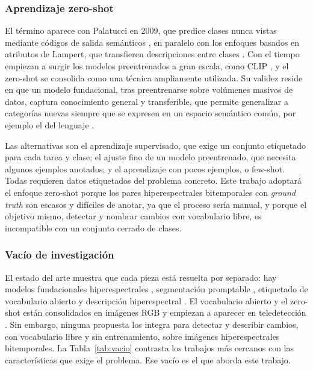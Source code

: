 \subsubsection{Aprendizaje zero-shot}

El término aparece con Palatucci en 2009, que predice clases nunca vistas mediante códigos de salida semánticos \parencite{palatucci2009zeroshot}, en paralelo con los enfoques basados en atributos de Lampert, que transfieren descripciones entre clases \parencite{lampert2009attribute}. Con el tiempo empiezan a surgir los modelos preentrenados a gran escala, como CLIP \parencite{radford2021clip}, y el zero-shot se consolida como una técnica ampliamente utilizada. Su validez reside en que un modelo fundacional, tras preentrenarse sobre volúmenes masivos de datos, captura conocimiento general y transferible, que permite generalizar a categorías nuevas siempre que se expresen en un espacio semántico común, por ejemplo el del lenguaje \parencite{wang2024hypersigma,radford2021clip}.

Las alternativas son el aprendizaje supervisado, que exige un conjunto etiquetado para cada tarea y clase; el ajuste fino de un modelo preentrenado, que necesita algunos ejemplos anotados; y el aprendizaje con pocos ejemplos, o few-shot. Todas requieren datos etiquetados del problema concreto. Este trabajo adoptará el enfoque zero-shot porque los pares hiperespectrales bitemporales con \textit{ground truth} son escasos y difíciles de anotar, ya que el proceso sería manual, y porque el objetivo mismo, detectar y nombrar cambios con vocabulario libre, es incompatible con un conjunto cerrado de clases.

\subsubsection{Vacío de investigación}

El estado del arte muestra que cada pieza está resuelta por separado: hay modelos fundacionales hiperespectrales \parencite{wang2024hypersigma}, segmentación promptable \parencite{kirillov2023sam}, etiquetado de vocabulario abierto \parencite{radford2021clip} y descripción hiperespectral \parencite{das2025hypercap}. El vocabulario abierto y el zero-shot están consolidados en imágenes RGB y empiezan a aparecer en teledetección \parencite{zhu2025semanticcd,kombol2025trainingfree}. Sin embargo, ninguna propuesta los integra para detectar y describir cambios, con vocabulario libre y sin entrenamiento, sobre imágenes hiperespectrales bitemporales. La Tabla~\ref{tab:vacio} contrasta los trabajos más cercanos con las características que exige el problema. Ese vacío es el que aborda este trabajo.

